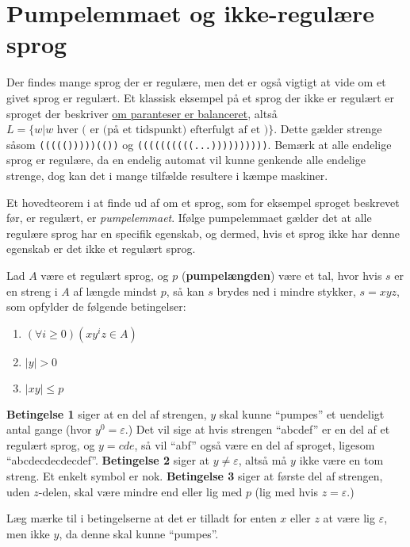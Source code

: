 \newpage
\section{Pumpelemmaet og ikke-regulære sprog}

Der findes mange sprog der er regulære, men det er også vigtigt at vide om et givet sprog er regulært. Et klassisk eksempel på et sprog der ikke er regulært er sproget der beskriver \href{https://www.hackerrank.com/challenges/balanced-brackets/problem}{om paranteser er balanceret}, altså $L = \{w | w \text{ hver ( er (på et tidspunkt) efterfulgt af et )}\}$. Dette gælder strenge såsom \texttt{((((()))))(())} og \texttt{((((((((((...))))))))))}. Bemærk at alle endelige sprog er regulære, da en endelig automat vil kunne genkende alle endelige strenge, dog kan det i mange tilfælde resultere i kæmpe maskiner.

Et hovedteorem i at finde ud af om et sprog, som for eksempel sproget beskrevet før, er regulært, er \textit{pumpelemmaet}. Ifølge pumpelemmaet gælder det at alle regulære sprog har en specifik egenskab, og dermed, hvis et sprog ikke har denne egenskab er det ikke et regulært sprog.

\begin{theorem}[Pumpelemmaet]
  \label{the:pumpelemma}
  Lad $A$ være et regulært sprog, og $p$ (\textbf{pumpelængden}) være et tal, hvor hvis $s$ er en streng i $A$ af længde mindst $p$, så kan $s$ brydes ned i mindre stykker, $s = xyz$, som opfylder de følgende betingelser:
  \begin{enumerate}
    \item $(\forall i \geq 0)(xy^{i}z \in A)$
    \item $|y| > 0$
    \item $|xy| \leq p$
  \end{enumerate}
\end{theorem}

\textbf{Betingelse 1} siger at en del af strengen, $y$ skal kunne ``pumpes'' et uendeligt antal gange (hvor $y^{0} = \varepsilon$.) Det vil sige at hvis strengen ``abcdef'' er en del af et regulært sprog, og $y = cde$, så vil ``abf'' også være en del af sproget, ligesom ``abcdecdecdecdef''.
\textbf{Betingelse 2} siger at $y \neq \varepsilon$, altså må $y$ ikke være en tom streng. Et enkelt symbol er nok.
\textbf{Betingelse 3} siger at første del af strengen, uden $z$-delen, skal være mindre end eller lig med $p$ (lig med hvis $z = \varepsilon$.)

Læg mærke til i betingelserne at det er tilladt for enten $x$ eller $z$ at være lig $\varepsilon$, men ikke $y$, da denne skal kunne ``pumpes''.

